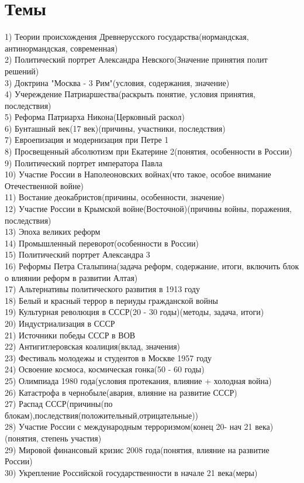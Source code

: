 \documentclass[a4paper, 12pt]{article}
\begin{document}
\section*{Темы}
1) Теории происхождения Древнерусского государства(нормандская, антинормандская, современная)\\
2) Политический портрет Александра Невского(Значение принятия полит решений)\\
3) Доктрина "Москва - 3 Рим"(условия, содержания, значение)\\
4) Учереждение Патриаршества(раскрыть понятие, условия принятия, последствия)\\
5) Реформа Патриарха Никона(Церковный раскол)\\
6) Бунташный век(17 век)(причины, участники, последствия)\\
7) Евроепизация и модернизация при Петре 1\\
8) Просвещенный абсолютизм при Екатерине 2(понятия, особенности в России)\\
9) Политический портрет императора Павла\\
10) Участие России в Наполеоновских войнах(что такое, особое внимание Отечественной войне)\\
11) Востание деокабристов(причины, особенности, значение)\\
12) Участие России в Крымской войне(Восточной)(причины войны, поражения, последствия)\\
13) Эпоха великих реформ\\
14) Промышленный переворот(особенности в России)\\
15) Политический портрет Александра 3\\
16) Реформы Петра Сталыпина(задача реформ, содержание, итоги, включить блок о влиянии реформ в развитии Алтая)\\
17) Альтернативы политического развития в 1913 году\\
18) Белый и красный террор в периуды гражданской войны\\
19) Культурная революция в СССР(20 - 30 годы)(методы, задача, итоги)\\
20) Индустриализация в СССР\\
21) Источники победы СССР в ВОВ\\
22) Антигитлеровская коалиция(вклад, значения)\\
23) Фестиваль молодежы и студентов в Москве 1957 году\\
24) Освоение космоса, космическая гонка(50 - 60 годы)\\
25) Олимпиада 1980 года(условия протекания, влияние + холодная война)\\
26) Катастрофа в чернобыле(авария, влияние на развитие СССР)\\
27) Распад СССР(причины(по блокам),последствия(положительный,отрицательные))\\
28) Участие России с международным терроризмом(конец 20- нач 21 века)(понятия, степень участия)\\
29) Мировой финансовый кризис 2008 года(понятия, влияние на развитие России)\\
30) Укрепление Российской государственности в начале 21 века(меры)
\end{document}
